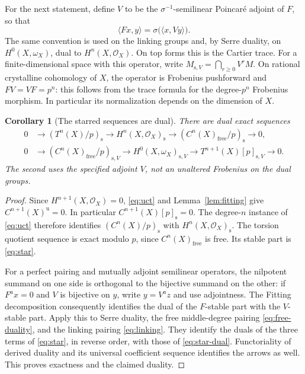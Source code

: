 \documentclass[11pt]{article}
\newtheorem{corollary}[theorem]{Corollary}
\theoremstyle{remark}\newtheorem{remark}[theorem]{Remark}
\newcommand{\OO}{\mathcal O}
\newcommand{\st}{\mathrm{s}}
\newcommand{\uF}{\mathrm{u}}
\begin{document}
For the next statement, define $V$ to be the $\sigma^{-1}$-semilinear Poincar\'e adjoint of $F$, so that
\[
 \langle Fx,y\rangle=\sigma\bigl(\langle x,Vy\rangle\bigr).
\]
The same convention is used on the linking groups and, by Serre duality, on $H^0(X,\omega_X)$, dual to $H^n(X,\OO_X)$. On top forms this is the Cartier trace. For a finite-dimensional space with this operator, write $M_{\st,V}=\bigcap_{r\ge0}V^rM$. On rational crystalline cohomology of $X$, the operator is Frobenius pushforward and $FV=VF=p^n$: this follows from the trace formula for the degree-$p^n$ Frobenius morphism. In particular its normalization depends on the dimension of $X$.

\begin{corollary}[The starred sequences are dual]\label{cor:star-dual}
There are dual exact sequences
\begin{align}
 0&\longrightarrow(T^n(X)/p)_{\st}
 \longrightarrow H^n(X,\OO_X)_{\st}
 \longrightarrow(C^n(X)_{\mathrm{free}}/p)_{\st}
 \longrightarrow0,\label{eq:star}\\
 0&\longrightarrow(C^n(X)_{\mathrm{free}}/p)_{\st,V}
 \longrightarrow H^0(X,\omega_X)_{\st,V}
 \longrightarrow T^{n+1}(X)[p]_{\st,V}
 \longrightarrow0.\label{eq:star-dual}
\end{align}
The second uses the specified adjoint $V$, not an unaltered Frobenius on the dual groups.
\end{corollary}
\begin{proof}
Since $H^{n+1}(X,\OO_X)=0$, \eqref{eq:uct} and Lemma~\ref{lem:fitting} give $C^{n+1}(X)^{\uF}=0$. In particular $C^{n+1}(X)[p]_{\st}=0$. The degree-$n$ instance of \eqref{eq:uct} therefore identifies $(C^n(X)/p)_{\st}$ with $H^n(X,\OO_X)_{\st}$. The torsion quotient sequence is exact modulo $p$, since $C^n(X)_{\mathrm{free}}$ is free. Its stable part is \eqref{eq:star}.

For a perfect pairing and mutually adjoint semilinear operators, the nilpotent summand on one side is orthogonal to the bijective summand on the other: if $F^a x=0$ and $V$ is bijective on $y$, write $y=V^a z$ and use adjointness. The Fitting decomposition consequently identifies the dual of the $F$-stable part with the $V$-stable part. Apply this to Serre duality, the free middle-degree pairing \eqref{eq:free-duality}, and the linking pairing \eqref{eq:linking}. They identify the duals of the three terms of \eqref{eq:star}, in reverse order, with those of \eqref{eq:star-dual}. Functoriality of derived duality and its universal coefficient sequence identifies the arrows as well. This proves exactness and the claimed duality.
\end{proof}
\end{document}
